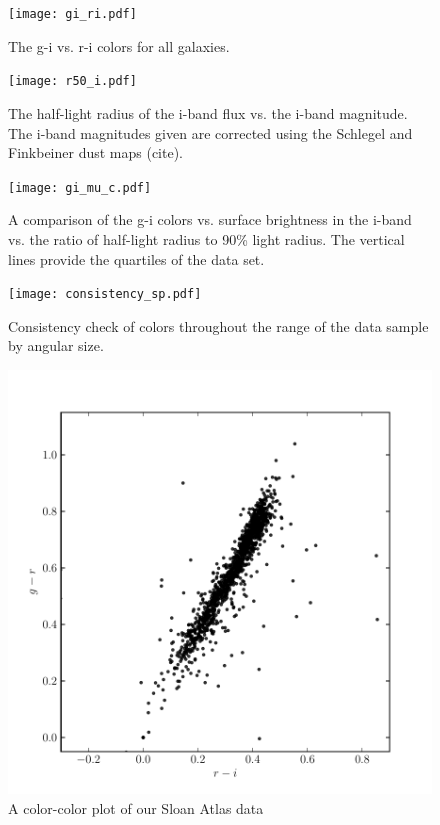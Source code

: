 \documentclass[12pt,preprint,pdftex]{aastex}
\begin{document}
\begin{figure}
\centering
\texttt{[image: gi\_ri.pdf]}
\caption{The g-i vs. r-i colors for all galaxies.}
\end{figure}


\begin{figure}
\centering
\texttt{[image: r50\_i.pdf]}
\caption{The half-light radius of the i-band flux vs. the i-band magnitude. The i-band magnitudes given are corrected using the Schlegel and Finkbeiner dust maps (cite).}
\end{figure}

\begin{figure}
\centering
\texttt{[image: gi\_mu\_c.pdf]}
\caption{A comparison of the g-i colors vs. surface brightness in the i-band vs. the ratio of half-light radius to 90\% light radius. The vertical lines provide the quartiles of the data set.}
\end{figure}

\begin{figure}
\centering
\texttt{[image: consistency\_sp.pdf]}
\caption{Consistency check of colors throughout the range of the data sample by angular size.}
\end{figure}

\begin{figure}
\centering
\includegraphics[trim = 15mm 0mm 0mm 0mm]{method_color_sloan.pdf}
\caption{A color-color plot of our Sloan Atlas data}
\end{figure}
\end{document}
